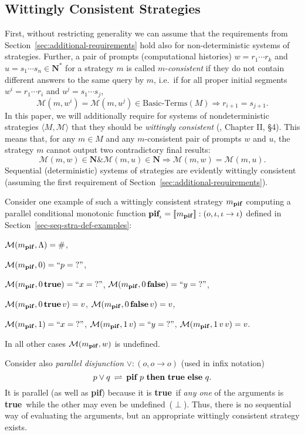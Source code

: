 \documentclass[fleqn]{LMCS}
\theoremstyle{plain}\newtheorem{satz}[thm]{Satz}
\theoremstyle{plain}\newtheorem{hyp}[thm]{Hypothesis}
\theoremstyle{plain}\newtheorem{hyps}[thm]{Hypotheses}
\theoremstyle{definition}\newtheorem{note}[thm]{Note}
\newcommand{\bYdef}{\mathrel{\BYDEF}}
\newcommand{\BYDEF}{\mbox{$\hspace{.2em}\rightleftharpoons\hspace{.2em}$}}
\newcommand{\arr}{\rightarrow}
\newcommand{\Arrr}{\Longrightarrow}
\newcommand{\la}{\langle}
\newcommand{\ra}{\rangle}
\newcommand{\Dsem}[1]{[\![ #1 ]\!]}
\newcommand{\tuple}[1]{\la #1 \ra}
\newcommand{\AND}{\mathrel{\&}}
\newcommand{\NN}{\mathbf{N}}
\newcommand{\PIF}{\mbox{\bf pif}}
\newcommand{\THEN}{\mbox{\bf then}}
\newcommand{\ELSE}{\mbox{\bf else}}
\newcommand{\mPIF}{m_{\rm\bf pif}}
\newcommand{\Undef}{{\perp}}
\newcommand{\MM}{{\mathcal M}}
\newcommand{\?}{\mbox{?}}
\newcommand{\false}{\mbox{\bf false}}
\newcommand{\true}{\mbox{\bf true}}
\begin{document}
\subsection{Wittingly Consistent Strategies}
\label{sec:wittingly-cons}

\noindent
First, without restricting generality we can assume that the 
requirements from Section~\ref{sec:additional-requirements} 
hold also for non-deterministic systems of strategies. 
Further, a pair of prompts (computational histories) 
$w=r_1\cdots r_k$ and $u=s_1\cdots s_n\in\NN^*$ 
for a strategy $m$ is called $m$-\emph{consistent}  
if they do not contain different answers 
to the same query by $m$, i.e.\ if 
for all proper initial segments 
$w^i=r_1\cdots r_i$ and $u^j=s_1\cdots s_j$, 
\[
\MM(m,w^i)=\MM(m,u^j)\in\mbox{Basic-Terms}(M)\Arrr r_{i+1}=s_{j+1}. 
\] 
In this paper, we will additionally require for systems of 
nondeterministic strategies $\tuple{M,\MM}$ that they 
should be 
\emph{wittingly consistent} (\cite{Saz76t}, Chapter II, \S4). 
This means 
that, for any $m\in M$ and any $m$-consistent pair 
of prompts $w$ and $u$, the strategy $m$ cannot output two contradictory 
final results:
\[
\MM(m,w)\in\NN\AND\MM(m,u)\in\NN\Arrr\MM(m,w)=\MM(m,u).
\]
Sequential (deterministic) systems of strategies are evidently 
wittingly consistent (assuming the first requirement 
of Section~\ref{sec:additional-requirements}). 





Consider one example of such a wittingly consistent 
strategy $\mPIF$ computing 
a parallel conditional monotonic function 
$\PIF_{\iota} = \Dsem{\mPIF}:(o,\iota,\iota\arr\iota)$ 
defined in Section~\ref{sec-seq-stra-def-examples}: 

$\MM(\mPIF,\Lambda)=\#$, 

$\MM(\mPIF,0)=\mbox{``$p=\?$''}$,  

$\MM(\mPIF,0\,\true)=\mbox{``$x=\?$''}$, 
$\MM(\mPIF,0\,\false)=\mbox{``$y=\?$''}$, 

$\MM(\mPIF,0\,\true\,v)=v$, 
$\MM(\mPIF,0\,\false\,v)=v$, 

$\MM(\mPIF,1)=\mbox{``$x=\?$''}$, 
$\MM(\mPIF,1\,v)=\mbox{``$y=\?$''}$, $\MM(\mPIF,1\,v\,v)=v$. 

\noindent
In all other cases $\MM(\mPIF,w)$ is undefined. 

Consider also 
\emph{parallel disjunction} $\vee:(o,o\arr o)$ 
(used in infix notation) 
\[
p\vee q \bYdef \PIF\ p\ \THEN\ \true\ \ELSE\ q.
\]
It is parallel (as well as \PIF) because it is \true\ if 
\emph{any one} of the arguments is \true\ 
while the other may even be undefined~($\Undef$). Thus, there is no 
sequential way of evaluating the arguments, but an appropriate 
wittingly consistent strategy exists. 
\end{document}
